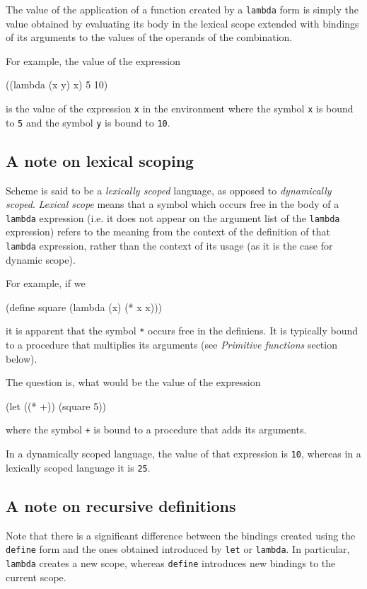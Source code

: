 The value of the application of a function created by a \texttt{lambda}
form is simply the value obtained by evaluating its body in the lexical
scope extended with bindings of its arguments to the values of the
operands of the combination.

For example, the value of the expression
\begin{Snippet}
((lambda (x y) x) 5 10)
\end{Snippet}
is the value of the expression \texttt{x} in the environment where
the symbol \texttt{x} is bound to \texttt{5} and the symbol \texttt{y}
is bound to \texttt{10}.

\subsection{A note on lexical scoping}

Scheme is said to be a \emph{lexically scoped} language, as opposed
to \emph{dynamically scoped}. \emph{Lexical scope} means
that a symbol which occurs free in the body of a \texttt{lambda}
expression (i.e. it does not appear on the argument list of the
\texttt{lambda} expression) refers to the meaning from the context
of the definition of that \texttt{lambda} expression, rather than
the context of its usage (as it is the case for dynamic scope).

For example, if we
\begin{Snippet}
(define square (lambda (x) (* x x)))
\end{Snippet}
it is apparent that the symbol \texttt{*} occurs free in the
definiens. It is typically bound to a procedure that multiplies
its arguments (see \emph{Primitive functions} section below).

The question is, what would be the value of the expression
\begin{Snippet}
(let ((* +))
  (square 5))
\end{Snippet}

where the symbol \texttt{+} is bound to a procedure that adds
its arguments.

In a dynamically scoped language, the value of that expression
is \texttt{10}, whereas in a lexically scoped language it is \texttt{25}.

\subsection{A note on recursive definitions}

Note that there is a significant difference between the bindings created
using the \texttt{define} form and the ones obtained introduced by
\texttt{let} or \texttt{lambda}. In particular, \texttt{lambda} creates
a new scope, whereas \texttt{define} introduces new bindings to the
current scope.

